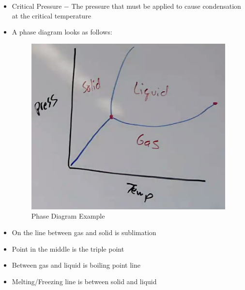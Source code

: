 \documentclass[12pt]{article}
\begin{document}
\begin{itemize}
\item Critical Pressure $-$ The pressure that must be applied to cause condensation at the critical temperature

\item A phase diagram looks as follows:

  \begin{figure}[H]
    \centering
    \includegraphics{Figures/PhaseDiagram.png}
    \caption{Phase Diagram Example}
    \label{fig:1}
  \end{figure}

\item On the line between gas and solid is sublimation

\item Point in the middle is the triple point

\item Between gas and liquid is boiling point line

\item Melting/Freezing line is between solid and liquid

\end{itemize}
\end{document}
